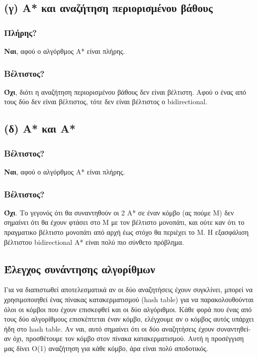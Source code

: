 \documentclass{article}
\begin{document}
\subsection*{(γ) Α* και αναζήτηση περιορισμένου βάθους}
\subsubsection*{Πλήρης?}
\textbf{Ναι}, αφού ο αλγόρθμος Α* είναι πλήρης.
\subsubsection*{Βέλτιστος?}

\textbf{Όχι}, διότι η αναζήτηση περιορισμένου βάθους δεν είναι βέλτιστη. Αφού ο ένας από τους δύο δεν είναι βέλτιστος, τότε δεν είναι βέλτιστος ο \textlatin{bidirectional}.

\subsection*{(δ) Α* και Α*}
\subsubsection*{Βέλτιστος?}
\textbf{Ναι}, αφού ο αλγόρθμος Α* είναι πλήρης.

\subsubsection*{Βέλτιστος?}
\textbf{Όχι}. Το γεγονός ότι θα συναντηθούν οι 2 Α* σε έναν κόμβο (ας πούμε Μ)  δεν σημαίνει ότι θα έχουν φτάσει στο Μ με τον βέλτιστο μονοπάτι, και ούτε καν ότι το πραγματικο βέλτιστο μονοπάτι από αρχή έως στόχο θα περιέχει το Μ. Η εξασφάλιση βέλτιστου \textlatin{bidirectional} Α* είναι πολύ πιο σύνθετο πρόβλημα.

\subsection*{Έλεγχος συνάντησης αλγορίθμων}
Για να διαπιστωθεί αποτελεσματικά αν οι δύο αναζητήσεις έχουν συγκλίνει, μπορεί να χρησιμοποιηθεί ένας πίνακας κατακερματισμού (\textlatin{hash table)} για να παρακολουθούνται όλοι οι κόμβοι που έχουν επισκεφθεί και οι δύο αλγόριθμοι. Κάθε φορά που ένας από τους δύο αλγορίθμους επισκέπτεται έναν κόμβο, ελέγχουμε αν ο κόμβος αυτός υπάρχει ήδη στο \textlatin{hash table}. Αν ναι, αυτό σημαίνει ότι οι δύο αναζητήσεις έχουν συναντηθεί- αν όχι, προσθέτουμε τον κόμβο στον πίνακα κατακερματισμού. Αυτή η προσέγγιση μας δίνει Ο(1) αναζήτηση για κάθε κόμβο, άρα είναι πολύ αποδοτικός.
\end{document}
